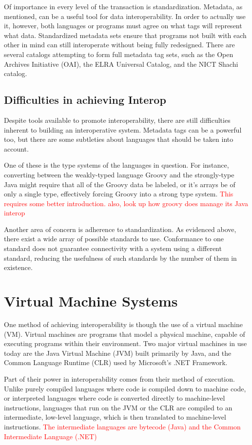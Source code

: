 \documentclass{sig-alternate}
\newcommand{\mycomment}[1]{\textcolor{red}{#1}}
\begin{document}
Of importance in every level of the transaction is standardization. Metadata, as mentioned, can be a useful tool for data interoperability. In order to actually use it, however, both languages or programs must agree on what tags will represent what data. Standardized metadata sets ensure that programs not built with each other in mind can still interoperate without being fully redesigned. There are several catalogs attempting to form full metadata tag sets, such as the Open Archives Initiative (OAI), the ELRA Universal Catalog, and the NICT Shachi catalog.\cite{Ide:2010}

\subsection*{Difficulties in achieving Interop}
Despite tools available to promote interoperability, there are still difficulties inherent to building an interoperative system. Metadata tags can be a powerful too, but there are some subtleties about languages that should be taken into account.

One of these is the type systems of the languages in question. For instance, converting between the weakly-typed language Groovy and the strongly-type Java might require that all of the Groovy data be labeled, or it's arrays be of only a single type, effectively forcing Groovy into a strong type system. \mycomment{This requires some better introduction. also, look up how groovy does manage its Java interop}

Another area of concern is adherence to standardization.
As evidenced above, there exist a wide array of possible standards to use. Conformance to one standard does not guarantee connectivity with a system using a different standard, reducing the usefulness of such standards by the number of them in existence.\cite{?}



\section{Virtual Machine Systems}\label{VM}
One method of achieving interoperability is though the use of a virtual machine (VM). Virtual machines are programs that model a physical machine, capable of executing programs within their environment. Two major virtual machines in use today are the Java Virtual Machine (JVM) built primarily by Java, and the Common Language Runtime (CLR) used by Microsoft's .NET Framework.

Part of their power in interoperability comes from their method of execution. Unlike purely compiled languages where code is compiled down to machine code, or interpreted languages where code is converted directly to machine-level instructions, languages that run on the JVM or the CLR are compiled to an intermediate, low-level language, which is then translated to machine-level instructions.
\mycomment{The intermediate languages are bytecode (Java) and the Common Intermediate Language (.NET)}
\end{document}
